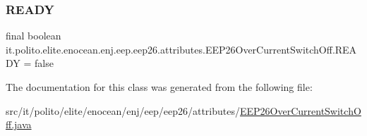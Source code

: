 \subsubsection{\texorpdfstring{R\+E\+A\+DY}{READY}}
{\footnotesize\ttfamily final boolean it.\+polito.\+elite.\+enocean.\+enj.\+eep.\+eep26.\+attributes.\+E\+E\+P26\+Over\+Current\+Switch\+Off.\+R\+E\+A\+DY = false\hspace{0.3cm}{\ttfamily [static]}}



The documentation for this class was generated from the following file\+:\begin{DoxyCompactItemize}
\item 
src/it/polito/elite/enocean/enj/eep/eep26/attributes/\hyperlink{_e_e_p26_over_current_switch_off_8java}{E\+E\+P26\+Over\+Current\+Switch\+Off.\+java}\end{DoxyCompactItemize}
